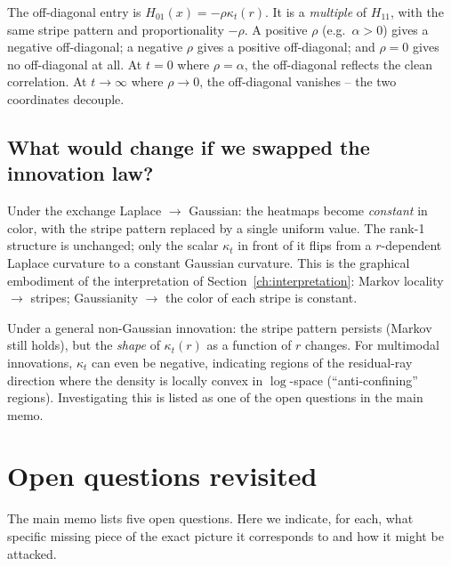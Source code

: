 \documentclass[11pt,a4paper,openany]{book}
\theoremstyle{plainserif}
\theoremstyle{definition}
\theoremstyle{remarkstyle}
\begin{document}
The off-diagonal entry is
$H_{01}(x) = -\rho \kappa_t(r)$. It is a \emph{multiple} of $H_{11}$,
with the same stripe pattern and proportionality $-\rho$. A positive
$\rho$ (e.g.\ $\alpha > 0$) gives a negative off-diagonal; a negative
$\rho$ gives a positive off-diagonal; and $\rho = 0$ gives no
off-diagonal at all. At $t=0$ where $\rho = \alpha$, the off-diagonal
reflects the clean correlation. At $t\to\infty$ where $\rho\to 0$, the
off-diagonal vanishes -- the two coordinates decouple.

\section{What would change if we swapped the innovation law?}

Under the exchange Laplace $\to$ Gaussian: the heatmaps become
\emph{constant} in color, with the stripe pattern replaced by a single
uniform value. The rank-1 structure is unchanged; only the scalar
$\kappa_t$ in front of it flips from a $r$-dependent Laplace curvature
to a constant Gaussian curvature. This is the graphical embodiment of
the interpretation of Section~\ref{ch:interpretation}: Markov locality
$\to$ stripes; Gaussianity $\to$ the color of each stripe is constant.

Under a general non-Gaussian innovation: the stripe pattern persists
(Markov still holds), but the \emph{shape} of $\kappa_t(r)$ as a function
of $r$ changes. For multimodal innovations, $\kappa_t$ can even be
negative, indicating regions of the residual-ray direction where the
density is locally convex in $\log$-space (``anti-confining'' regions).
Investigating this is listed as one of the open questions in the main
memo.

\chapter{Open questions revisited}
\label{ch:open}

The main memo lists five open questions. Here we indicate, for each, what
specific missing piece of the exact picture it corresponds to and how
it might be attacked.
\end{document}
